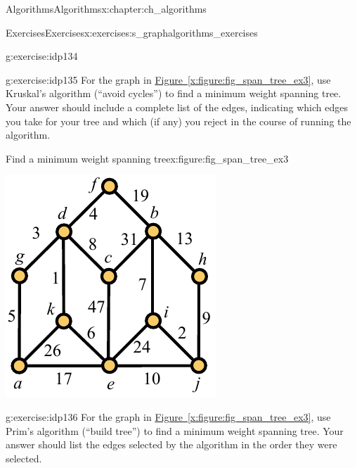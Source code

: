 \documentclass[oneside,10pt,]{book}
\newcommand{\xreffont}{\relax}
\numberwithin{equation}{section}
\begin{document}
\begin{chapterptx}{Algorithms}{}{Algorithms}{}{}{x:chapter:ch_algorithms}
\begin{exercises-section}{Exercises}{}{Exercises}{}{}{x:exercises:s_graphalgorithms_exercises}
\begin{divisionexercise}{4}{}{}{g:exercise:idp134}
\end{divisionexercise}%
\begin{divisionexercise}{5}{}{}{g:exercise:idp135}%
For the graph in \hyperref[x:figure:fig_span_tree_ex3]{Figure~{\xreffont\ref{x:figure:fig_span_tree_ex3}}}, use Kruskal's algorithm (``avoid cycles'') to find a minimum weight spanning tree. Your answer should include a complete list of the edges, indicating which edges you take for your tree and which (if any) you reject in the course of running the algorithm.%
\begin{figureptx}{Find a minimum weight spanning tree}{x:figure:fig_span_tree_ex3}{}%
\begin{image}{0.275}{0.45}{0.275}%
\includegraphics[width=\linewidth]{images/span_tree_ex3}
\end{image}%
\tcblower
\end{figureptx}%
\end{divisionexercise}%
\begin{divisionexercise}{6}{}{}{g:exercise:idp136}%
For the graph in \hyperref[x:figure:fig_span_tree_ex3]{Figure~{\xreffont\ref{x:figure:fig_span_tree_ex3}}}, use Prim's algorithm (``build tree'') to find a minimum weight spanning tree. Your answer should list the edges selected by the algorithm in the order they were selected.%

\end{divisionexercise}
\end{exercises-section}
\end{chapterptx}
\end{document}
